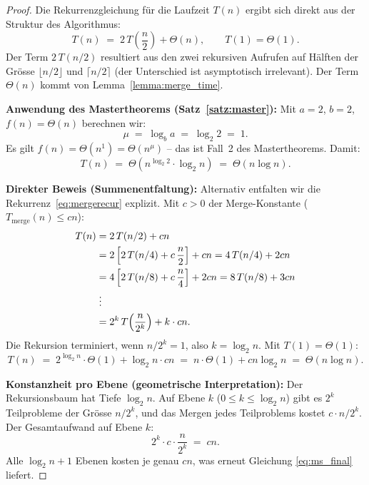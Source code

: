 ﻿\documentclass[a4paper,12pt]{article}
\theoremstyle{definition}
\begin{document}
\begin{proof}
    Die Rekurrenzgleichung für die Laufzeit $T(n)$ ergibt sich direkt aus der
    Struktur des Algorithmus:
    \begin{equation}
        T(n) \;=\; 2\,T\!\left(\frac{n}{2}\right) + \Theta(n), \qquad T(1) = \Theta(1).
        \label{eq:mergerecur}
    \end{equation}
    Der Term $2\,T(n/2)$ resultiert aus den zwei rekursiven Aufrufen auf Hälften
    der Grösse $\lfloor n/2 \rfloor$ und $\lceil n/2 \rceil$ (der Unterschied ist
    asymptotisch irrelevant). Der Term $\Theta(n)$ kommt von Lemma~\ref{lemma:merge_time}.

    \textbf{Anwendung des Mastertheorems (Satz~\ref{satz:master}):}
    Mit $a = 2$, $b = 2$, $f(n) = \Theta(n)$ berechnen wir:
    \[
        \mu \;=\; \log_b a \;=\; \log_2 2 \;=\; 1.
    \]
    Es gilt $f(n) = \Theta(n^1) = \Theta(n^\mu)$ -- das ist Fall~2 des
    Mastertheorems. Damit:
    \[
        T(n) \;=\; \Theta\!\left(n^{\log_2 2} \cdot \log_2 n\right)
              \;=\; \Theta(n \log n).
    \]

    \textbf{Direkter Beweis (Summenentfaltung):}
    Alternativ entfalten wir die Rekurrenz~\eqref{eq:mergerecur} explizit.
    Mit $c > 0$ der Merge-Konstante ($T_{\mathrm{merge}}(n) \leq cn$):
    \begin{align}
        T(n) &= 2\,T(n/2) + cn \notag\\
             &= 2\left[2\,T(n/4) + c\,\frac{n}{2}\right] + cn
              = 4\,T(n/4) + 2cn \notag\\
             &= 4\left[2\,T(n/8) + c\,\frac{n}{4}\right] + 2cn
              = 8\,T(n/8) + 3cn \notag\\
             &\;\vdots \notag\\
             &= 2^k\,T\!\left(\frac{n}{2^k}\right) + k \cdot cn. \notag
    \end{align}
    Die Rekursion terminiert, wenn $n/2^k = 1$, also $k = \log_2 n$.
    Mit $T(1) = \Theta(1)$:
    \begin{equation}
        T(n) \;=\; 2^{\log_2 n} \cdot \Theta(1) + \log_2 n \cdot cn
              \;=\; n \cdot \Theta(1) + cn \log_2 n
              \;=\; \Theta(n \log n). \label{eq:ms_final}
    \end{equation}

    \textbf{Konstanzheit pro Ebene (geometrische Interpretation):}
    Der Rekursionsbaum hat Tiefe $\log_2 n$. Auf Ebene $k$ ($0 \leq k \leq \log_2 n$)
    gibt es $2^k$ Teilprobleme der Grösse $n/2^k$, und das Mergen jedes
    Teilproblems kostet $c \cdot n/2^k$. Der Gesamtaufwand auf Ebene $k$:
    \[
        2^k \cdot c \cdot \frac{n}{2^k} \;=\; cn.
    \]
    Alle $\log_2 n + 1$ Ebenen kosten je genau $cn$, was erneut Gleichung
    \eqref{eq:ms_final} liefert. \qedhere
\end{proof}
\end{document}
